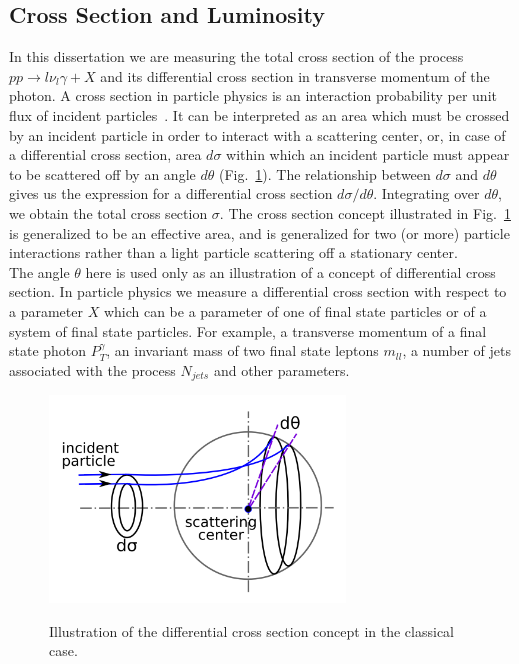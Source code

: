 \subsection{Cross Section and Luminosity}
\label{sec:WgAbout_LumiAndCS}

In this dissertation we are measuring the total cross section of the process $pp \rightarrow l \nu_l \gamma + X$ and its differential cross section in transverse momentum of the photon. A cross section in particle physics is an interaction probability per unit flux of incident particles~\cite{ref_fnal_LumiCS}. It can be interpreted as an area which must be crossed by an incident particle in order to interact with a scattering center, or, in case of a differential cross section, area $d\sigma$ within which an incident particle must appear to be scattered off by an angle $d\theta$ (Fig.~\ref{fig:CSclassical}). The relationship between $d\sigma$ and $d\theta$ gives us the expression for a differential cross section $d\sigma/d\theta$. Integrating over $d\theta$, we obtain the total cross section $\sigma$. The cross section concept illustrated in Fig.~\ref{fig:CSclassical} is generalized to be an effective area, and is generalized for two (or more) particle interactions rather than a light particle scattering off a stationary center. \\

The angle $\theta$ here is used only as an illustration of a concept of differential cross section. In particle physics we measure a differential cross section with respect to a parameter $X$ which can be a parameter of one of final state particles or of a system of final state particles. For example, a transverse momentum of a final state photon $P_T^\gamma$, an invariant mass of two final state leptons $m_{ll}$, a number of jets associated with the process $N_{jets}$ and other parameters. \\

\begin{figure}[htb]
  \begin{center}
    {\includegraphics[width=0.70\textwidth]{../figs/WgAbout/CSclassical.png}}
    \caption{Illustration of the differential cross section concept in the classical case.}
    \label{fig:CSclassical}
  \end{center}
\end{figure}

